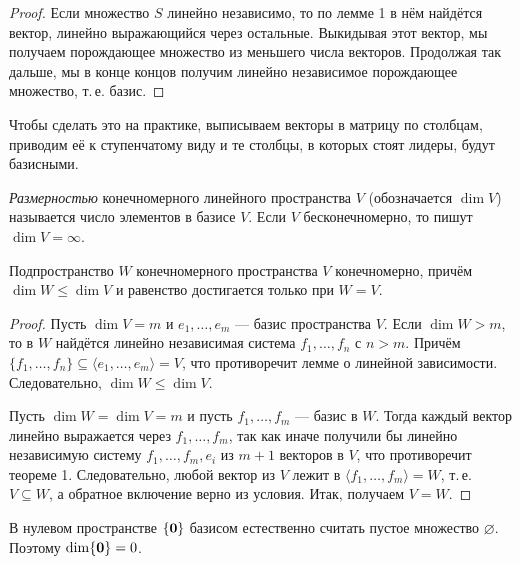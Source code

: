 \begin{proof}
    Если множество $S$ линейно независимо, то по лемме 1 в нём найдётся вектор, линейно выражающийся через остальные. Выкидывая этот вектор, мы получаем порождающее множество из меньшего числа векторов. Продолжая так дальше, мы в конце концов получим линейно независимое порождающее множество, т.\,е. базис.
\end{proof}

\begin{remark}
    Чтобы сделать это на практике, выписываем векторы в матрицу по столбцам, приводим её к ступенчатому виду и те столбцы, в которых стоят лидеры, будут базисными.
\end{remark}

\begin{definition}
    \textit{Размерностью} конечномерного линейного пространства $V$ (обозначается $\dim V$) называется число элементов в базисе $V$. Если $V$ бесконечномерно, то пишут $\dim V = \infty$.
\end{definition}

\begin{lemma}
    Подпространство $W$ конечномерного пространства $V$ конечномерно, причём $\dim W \leqslant \dim V$ и равенство достигается только при $W = V$.
\end{lemma}

\begin{proof}
    Пусть $\dim V = m$ и $e_1, \ldots, e_m$ --- базис пространства $V$. Если $\dim W > m$, то в $W$ найдётся линейно независимая система $f_1, \ldots, f_n$ с $n > m$. Причём $\{f_1, \ldots, f_n\} \subseteq \langle e_1, \ldots, e_m\rangle = V$, что противоречит лемме о линейной зависимости. Следовательно, $\dim W \leqslant \dim V$.

    Пусть $\dim W = \dim V = m$ и пусть $f_1, \ldots, f_m$ --- базис в $W$. Тогда каждый вектор линейно выражается через $f_1, \ldots, f_m$, так как иначе получили бы линейно независимую систему $f_1, \ldots, f_m, e_i$ из $m + 1$ векторов в $V$, что противоречит теореме 1. Следовательно, любой вектор из $V$ лежит в $\langle f_1, \ldots, f_m\rangle = W$, т.\,е. $V \subseteq W$, а обратное включение верно из условия. Итак, получаем $V = W$.
\end{proof}

\begin{remark}
    В нулевом пространстве $\{\boldsymbol{0}\}$ базисом естественно считать пустое множество $\varnothing$. Поэтому $\dim\{\boldsymbol{0}\} = 0$.
\end{remark}

